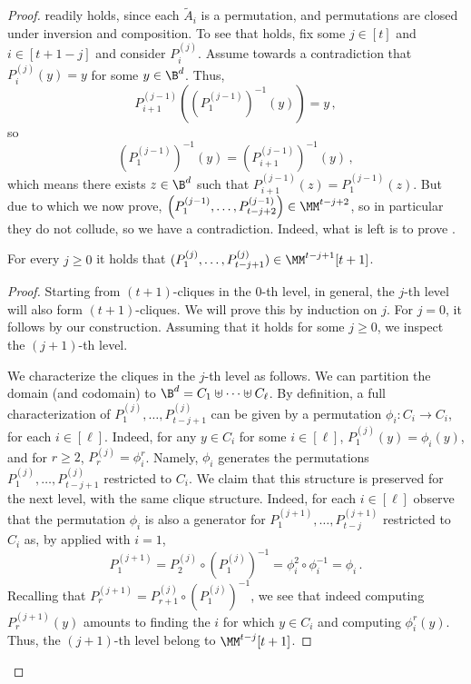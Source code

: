 \documentclass{toc}
\begin{document}
\begin{proof}
 readily holds, since each $\widetilde{A}_i$ is a permutation, and permutations are closed
under inversion and composition. To see that  holds, fix some
$j \in [t]$ and $i \in [t+1-j]$ and consider $P_{i}^{(j)}$. Assume
towards a contradiction that $P_{i}^{(j)}(y) = y$ for some $y \in \B^d$. Thus,
\[
P_{i+1}^{(j-1)} \left( \left(P_{1}^{(j-1)}\right)^{-1}(y)\right) = y\,,
\]
so
\[
\left(P_{1}^{(j-1)}\right)^{-1}(y) = \left( P_{i+1}^{(j-1)} \right)^{-1}(y)\,,
\]
which means there exists $z \in \B^d$ such that $P_{i+1}^{(j-1)}(z) = P_{1}^{(j-1)}(z)$.
But due to  which we now prove, $\left( P_{1}^{(j-1)},\ldots,P_{t-j+2}^{(j-1)} \right) \in \MM^{t-j+2}$,
so in particular they do not collude, so we have a contradiction. Indeed, what is left is 
to prove .
\begin{claim}
For every $j \ge 0$ it holds that $( P_{1}^{(j)},\ldots,P_{t-j+1}^{(j)} ) \in \MM^{t-j+1}[t+1]$.
\end{claim}
\begin{proof}
Starting from $(t+1)$-cliques in the $0$-th level, in general, the $j$-th level
will also form $(t+1)$-cliques. We will prove this by induction on $j$. For $j = 0$, it follows
by our construction. Assuming that it holds for some $j \ge 0$, we inspect the $(j+1)$-th level.

We characterize the cliques in the $j$-th level as follows. We can partition the domain (and codomain)
to $\B^d = C_1 \uplus \cdots \uplus C_{\ell}$. By definition, a full characterization of
$P_1^{(j)},\ldots,P_{t-j+1}^{(j)}$ can be given by a permutation
$\phi_i \colon C_i \rightarrow C_i$, for each $i \in [\ell]$. Indeed, 
for any $y \in C_i$ for some $i \in [\ell]$, $P_{1}^{(j)}(y) = \phi_{i}(y)$, and
for $r \ge 2$, $P_{r}^{(j)} = \phi_{i}^r$. Namely, $\phi_i$ generates the permutations $P_1^{(j)},\ldots,P_{t-j+1}^{(j)}$ restricted to $C_i$.
We claim that this structure is preserved for the next level, with the same clique structure. Indeed, for each $i \in [\ell]$ observe that the permutation ${\phi}_i$ is also a generator for $P_1^{(j+1)},\ldots,P_{t-j}^{(j+1)}$ restricted to $C_i$ as, by  applied with $i=1$,
\[
P^{(j+1)}_{1} = P_{2}^{(j)} \circ \left( P_{1}^{(j)} \right)^{-1} = \phi_i^2 \circ \phi_i^{-1} = \phi_i\,.
\]
%
%
%
Recalling that $P^{(j+1)}_{r} = P_{r+1}^{(j)} \circ \left( P_{1}^{(j)} \right)^{-1}$, we see that indeed
computing $P^{(j+1)}_{r}(y)$ amounts to finding the $i$ for which $y \in C_i$
and computing $\phi_i^r(y)$. Thus, the $(j+1)$-th level belong to $\MM^{t-j}[t+1]$.
\end{proof}
\end{proof}
\end{document}
